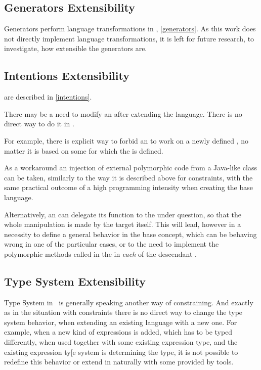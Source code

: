 \subsection{Generators Extensibility}

Generators perform language transformations in \jbmps, \ref{generators}. As this work does not directly 
implement language transformations, it is left for future research, to investigate, how extensible the 
generators are. 

\subsection{Intentions Extensibility}

 are described in \ref{intentions}. 

There may be a need to modify an  after extending the language. There is no direct way to do it 
in \jbmps. 

For example, there is explicit way to forbid an  to work on a newly defined , no matter
it is based on some  for which the  is defined.

As a workaround an injection of external polymorphic code from a Java-like class can be taken, similarly to the way it is 
described above for constraints, with the same practical outcome of a high programming intensity when creating the base language.

Alternatively, an  can delegate its function to the  under question, so that the whole manipulation is 
made by the target  itself. This will lead, however in a necessity to define a general behavior in the base concept, which can
be behaving wrong in one of the particular cases, or to the need to implement the polymorphic methods called in the  in 
\emph{each} of the descendant .

\subsection{Type System Extensibility}

Type System in \jbmps\ is generally speaking another way of constraining. And exactly as in the situation with constraints 
there is no direct way to change the type system behavior, when extending an existing language with a new one. For example, 
when a new kind of expressions is added, which has to be typed differently, when used together with some existing expression type,
and the existing expression ty[e system is determining the type, it is not possible to redefine this behavior or extend in
naturally with some provided by \jbmps tools.

